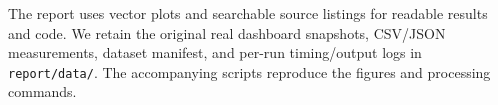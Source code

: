 The report uses vector plots and searchable source listings for readable results and code. We retain the original real dashboard snapshots, CSV/JSON measurements, dataset manifest, and per-run timing/output logs in \texttt{report/data/}. The accompanying scripts reproduce the figures and processing commands.
